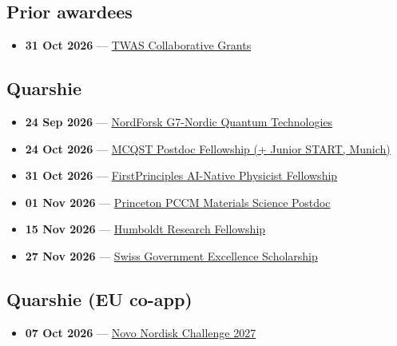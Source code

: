 \subsection*{Prior awardees}
\begin{itemize}[leftmargin=1.4em,itemsep=0.1em]
  \item \textbf{31 Oct 2026} --- \href{https://www.twas.org/opportunity/twas-research-grants-programme-interdisciplinary-research-collaborative-grants}{TWAS Collaborative Grants}
\end{itemize}

\subsection*{Quarshie}
\begin{itemize}[leftmargin=1.4em,itemsep=0.1em]
  \item \textbf{24 Sep 2026} --- \href{https://www2.fundsforngos.org/science/applications-open-for-quantum-technologies-funding-program/}{NordForsk G7-Nordic Quantum Technologies}
  \item \textbf{24 Oct 2026} --- \href{https://www.mcqst.de/support/postdoctoral-programs/postdoc-fellowship.html}{MCQST Postdoc Fellowship (+ Junior START, Munich)}
  \item \textbf{31 Oct 2026} --- \href{https://www.firstprinciplesfoundation.org/programs}{FirstPrinciples AI-Native Physicist Fellowship}
  \item \textbf{01 Nov 2026} --- \href{https://pccm.princeton.edu/education/postdoc-fellowship}{Princeton PCCM Materials Science Postdoc}
  \item \textbf{15 Nov 2026} --- \href{https://www.humboldt-foundation.de/en/apply/sponsorship-programmes/humboldt-research-fellowship}{Humboldt Research Fellowship}
  \item \textbf{27 Nov 2026} --- \href{https://www.sbfi.admin.ch/en/swiss-government-excellence-scholarships}{Swiss Government Excellence Scholarship}
\end{itemize}

\subsection*{Quarshie (EU co-app)}
\begin{itemize}[leftmargin=1.4em,itemsep=0.1em]
  \item \textbf{07 Oct 2026} --- \href{https://ogr.knust.edu.gh/funding/novo-nordisk-foundation-challenge-programme-2027-harnessing-novel-earth-abundant-materials}{Novo Nordisk Challenge 2027}
\end{itemize}


